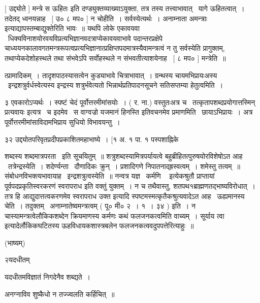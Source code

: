 \documentclass[11pt, openany]{book}
\begin{document}
 [ उद्द्योते ] {\qt मन्त्रे स ऊहितः} इति दण्ड्युक्तव्याख्याऽयुक्ता,
तत्र तस्य तत्त्वाभावात् \textendash\ यागे ऊहितत्वात्~। तदेतद् ध्वनयन्नाह \textendash\ [ उ० ८
मप० ] न चोहीति~। सर्वस्येत्यर्थः~। {\qt अनाम्नाता अमन्त्राः}
इत्याद्यापस्तम्बाद्युक्तेरिति भावः~॥ यथपि लोके एकावयवा \textendash\ 
धिक्यविनाशयोरवयविप्रत्यभिज्ञानवदत्राप्येकावयवाभावे पदान्तरप्रक्षेपे
चाध्ययनकालावगतमन्त्ररूपत्वप्रत्यभिज्ञानात्प्रक्षिप्तपदमात्रस्यैवामन्त्रत्वं
न तु सर्वस्येति प्रागुक्तम्, तथाप्येकदेशोहस्थले तथा संभवेऽपि सर्वोहस्थले
न संभवतीत्याशयेनाह \textendash\ [ ८ मप० ] मन्त्रेति~॥ 



त्प्रामादिकम्~। तादृशपाठस्यासत्वेन कुड्याभावे चित्राभावात्~। ग्रन्थस्य
चायमभिप्रायःअस्य \textendash\ इन्द्रशत्रुर्वर्धस्वेत्यस्य इन्द्रस्य
शत्रुर्भवेत्यतो भिन्नार्थप्रतिपादनसूचने सतिसप्तम्या हेतुत्वमिति~। 

 ३ एवकारोऽप्यर्थः~। स्पष्टं चेदं पूर्वोत्तरमीमांसयोः~। ( र. ना.)
वस्तुतःअत्र च \textendash\ {\qt तत्कृतापशब्दप्रयोगात्तस्मिन् प्रत्यवायः} इत्यत्र \textendash\ च
इदमेव \textendash\ {\qt स वाग्वज्रो यजमानं हिनस्ति} इतिवचनमेव प्रमाणमिति \textendash\ 
छायाऽभिप्रायः~। अत्र पूर्वोत्तरमीमांसाविदामभिप्राय सुधियो
विभावयन्तु~। 

३२ उद्द्योतपरिवृतप्रदीपप्रकाशितमहाभाष्ये~। [१ अ. १ पा. १ पस्पशाह्निके




शब्दस्य शब्दमात्रपरता \textendash\ इति सूचयितुम्~॥ शत्रुशब्दस्यामित्रपर्यायत्वे
बहुब्रीहितत्पुरुषयोरविशेषोऽत आह \textendash\ तत्रेन्द्रस्येति~। शदेर्ण्यन्ता \textendash\ 
दौणादिकः क्रुन्~। प्रशादिगणे निपातनाद्ह्रस्वत्वम्~। शमेस्तु तत्वम्~॥
संबोधनविभक्त्यभावायाह \textendash\ इन्द्रशत्रुत्वस्येति~॥ नन्वत्र {\qt यज्ञ \textendash\ 
कर्मणि \textendash\ } इत्येकश्रुतौ प्राप्तायां पूर्वपदप्रकृतिस्वरकरणं स्वरापराध इति
वक्तुं युक्तम्~। न च तथैवास्तु, शतपथ१ब्राह्मणतद्भाष्यविरोधात्~। तत्र हि
आद्युदात्तत्वकरणमेव स्वरापराध उक्त इत्यादि
स्पष्टमस्मत्कृतैकश्रुत्यवादेऽत आह \textendash\ ऊह्यमानस्य चेति~। 
तदुक्तम् \textendash\ {\qt अनाम्नातेष्वमन्त्रत्वम्} ( पू० मी० २~। १~। ३४ ) इति~। न
चास्यामन्त्रत्वेलौकिकशब्देन क्रियमाणस्य कर्मणः कथं फलजनकत्वमिति
वाच्यम्~। {\qt सूर्याय त्वा} इत्यादेर्लौकिकघटितस्य ऊहविधायकशास्त्रबलेन
फलजनकत्ववदुपपत्तेरित्याहुः~॥ 

 (भाष्यम्) 

२यदधीतम् \textendash\ 

यदधीतमविज्ञातं निगदेनैव शब्द्यते~। 

अनग्नाविव शुष्कैधो न तज्ज्वलति कर्हिचित्~॥
\end{document}

